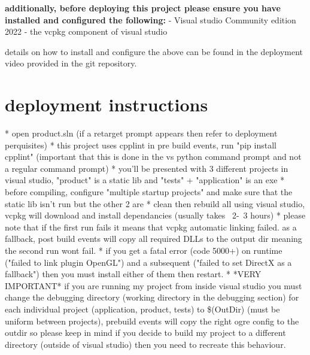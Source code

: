 \documentclass[]{final_report}
\begin{document}
\textbf{additionally, before deploying this project please ensure you have installed and configured the following:} \newline
-  Visual studio Community edition 2022
-  the vcpkg component of visual studio 


details on how to install and configure the above can be found in the deployment video provided in the git repository.
\section{deployment instructions}

* open product.sln (if a retarget prompt appears then refer to deployment perquisites) \newline
* this project uses cpplint in pre build events, run "pip install cpplint" (important that this is done in the vs python command prompt and not a regular command prompt) \newline
* you'll be presented with 3 different projects in visual studio, "product" is a static lib and "tests" + "application" is an exe \newline
* before compiling, configure "multiple startup projects" and make sure that the static lib isn't run but the other 2 are \newline
* clean then rebuild all using visual studio, vcpkg will download and install dependancies (usually takes ~2-~3 hours) \newline
* please note that if the first run fails it means that vcpkg automatic linking failed. as a fallback, post build events will copy all required DLLs to the output dir meaning the second run wont fail. \newline
* if you get a fatal error (code 5000+) on runtime ("failed to link plugin OpenGL") and a subsequent ("failed to set DirectX as a fallback") then you must install either of them then restart. \newline
* *VERY IMPORTANT* if you are running my project from inside visual studio you must change the debugging directory (working directory in the debugging section) for each individual project (application, product, tests)  to \$(OutDir) (must be uniform between projects), prebuild events will copy the right ogre config to the outdir so please keep in mind if you decide to build my project to a different directory (outside of visual studio) then you need to recreate this behaviour.\newline
\end{document}
